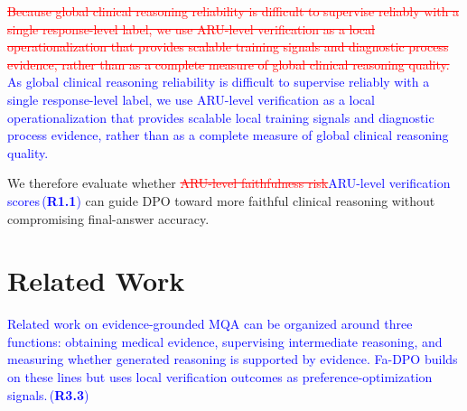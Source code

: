 \documentclass[a4paper,fleqn,doubleblind]{cas-sc}
\DeclareRobustCommand{\deleted}[1]{\textcolor{red}{\sout{#1}}}
\DeclareRobustCommand{\added}[1]{\textcolor{blue}{#1}}
\DeclareRobustCommand{\revtag}[1]{\textcolor{blue}{\scriptsize\,(\textbf{#1})}}
\begin{document}
\deleted{Because global clinical reasoning reliability is difficult to supervise reliably with a single response-level label, we use ARU-level verification as a local operationalization that provides scalable training signals and diagnostic process evidence, rather than as a complete measure of global clinical reasoning quality.}
\added{As global clinical reasoning reliability is difficult to supervise reliably with a single response-level label, we use ARU-level verification as a local operationalization that provides scalable local training signals and diagnostic process evidence, rather than as a complete measure of global clinical reasoning quality.}

We therefore evaluate whether \deleted{ARU-level faithfulness risk}\added{ARU-level verification scores}\revtag{R1.1} can guide DPO toward more faithful clinical reasoning without compromising final-answer accuracy.



\section{Related Work}

\added{Related work on evidence-grounded MQA can be organized around three functions: obtaining medical evidence, supervising intermediate reasoning, and measuring whether generated reasoning is supported by evidence. Fa-DPO builds on these lines but uses local verification outcomes as preference-optimization signals.}\revtag{R3.3}
\end{document}
